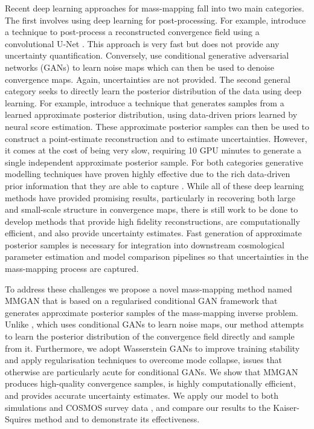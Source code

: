 \documentclass[fleqn,usenatbib]{mnras}
\begin{document}
Recent deep learning approaches for mass-mapping fall into two main categories. The first involves using deep learning for post-processing. For example, \citet{jeffrey2020deep} introduce a technique to post-process a reconstructed convergence field using a convolutional U-Net \citep{ronneberger2015u}. This approach is very fast but does not provide any uncertainty quantification. Conversely, \citet{shirasaki2021noise} use conditional generative adversarial networks (GANs) to learn noise maps which can then be used to denoise convergence maps.  Again, uncertainties are not provided. The second general category seeks to directly learn the posterior distribution of the data using deep learning. For example, \citet{remy2023probabilistic} introduce a technique that generates samples from a learned approximate posterior distribution, using data-driven priors learned by neural score estimation. These approximate posterior samples can then be used to construct a point-estimate reconstruction and to estimate uncertainties. However, it comes at the cost of being very slow, requiring 10 GPU minutes to generate a single independent approximate posterior sample. For both categories generative modelling techniques have proven highly effective due to the rich data-driven prior information that they are able to capture \citep{shirasaki2021noise,remy2023probabilistic}.  While all of these deep learning methods have provided promising results, particularly in recovering both large and small-scale structure in convergence maps, there is still work to be done to develop methods that provide high fidelity reconstructions, are computationally efficient, and also provide uncertainty estimates.  Fast generation of approximate posterior samples is necessary for integration into downstream cosmological parameter estimation and model comparison pipelines so that uncertainties in the mass-mapping process are captured.

To address these challenges we propose a novel mass-mapping method named MMGAN that is based on a regularised conditional GAN framework that generates approximate posterior samples of the mass-mapping inverse problem. Unlike \citet{shirasaki2021noise}, which uses conditional GANs to learn noise maps, our method attempts to learn the posterior distribution of the convergence field directly and sample from it. Furthermore, we adopt Wasserstein GANs \citep{arjovsky2017wasserstein} to improve training stability and apply regularisation techniques \citep{bendel2024regularized} to overcome mode collapse, issues that otherwise are particularly acute for conditional GANs. We show that MMGAN produces high-quality convergence samples, is highly computationally efficient, and provides accurate uncertainty estimates. We apply our model to both simulations and COSMOS survey data \citep{scoville2007cosmos}, and compare our results to the Kaiser-Squires method and \citet{remy2023probabilistic} to demonstrate its effectiveness.
\end{document}
